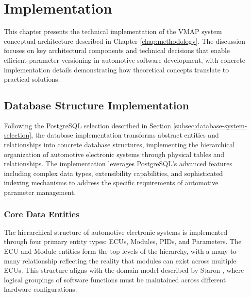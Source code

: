 \chapter{Implementation}
\label{chap:implementation}

This chapter presents the technical implementation of the \ac{VMAP} system conceptual architecture described in Chapter \ref{chap:methodology}. The discussion focuses on key architectural components and technical decisions that enable efficient parameter versioning in automotive software development, with concrete implementation details demonstrating how theoretical concepts translate to practical solutions.

\section{Database Structure Implementation}
\label{sec:database-structure-implementation}

Following the PostgreSQL selection described in Section \ref{subsec:database-system-selection}, the database implementation transforms abstract entities and relationships into concrete database structures, implementing the hierarchical organization of automotive electronic systems through physical tables and relationships. The implementation leverages PostgreSQL's advanced features including complex data types, extensibility capabilities, and sophisticated indexing mechanisms to address the specific requirements of automotive parameter management.

\subsection{Core Data Entities}
\label{subsec:core-data-entities}

The hierarchical structure of automotive electronic systems is implemented through four primary entity types: \acp{ECU}, Modules, \acp{PID}, and Parameters. The \ac{ECU} and Module entities form the top levels of the hierarchy, with a many-to-many relationship reflecting the reality that modules can exist across multiple \acp{ECU}. This structure aligns with the domain model described by Staron \cite{staron2021automotive}, where logical groupings of software functions must be maintained across different hardware configurations.

